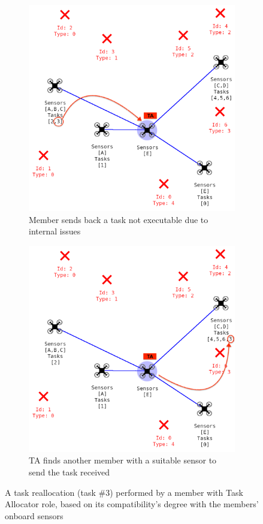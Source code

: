 \begin{figure}[!htbp]
	\centering
	\begin{subfigure}[t]{.45\textwidth}
	\centering
	    \includegraphics[width=0.95\linewidth]{img/scenario_03.png}
	    \caption{Member sends back a task not executable due to internal issues\label{fig:scene03}}
	\end{subfigure}
	\begin{subfigure}[t]{.45\textwidth}
	\centering
	    \includegraphics[width=0.95\linewidth]{img/scenario_04.png}
	    \caption{TA finds another member with a suitable sensor to send the task received \label{fig:scene04}}
	\end{subfigure}
	\caption{A task reallocation (task \#3) performed by a member with Task Allocator role, based on its compatibility's degree with the members' onboard sensors}
	\label{fig:TA_behavior}
\end{figure}



